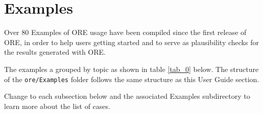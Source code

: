 \section{Examples}\label{sec:examples}

Over 80 Examples of ORE usage have been compiled since the first release of ORE, in order to help
users getting started and to serve as plausibility checks for the results generated with ORE.

The examples a grouped by topic as shown in table \ref{tab_0} below. The structure of the
{\tt ore/Examples} folder follows the same structure as this User Guide section.

Change to each subsection below and the associated Examples subdirectory to learn more about the list
of cases.

